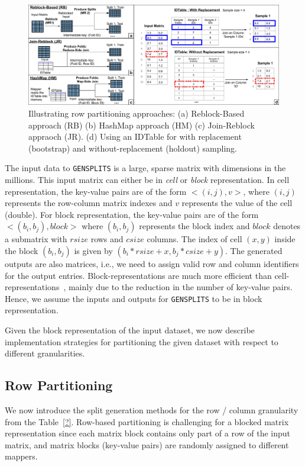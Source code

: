 \documentclass{vldb}
\begin{document}
\begin{figure}
\centering
\includegraphics[width=7in]{meta/rbjrhm.pdf}
\caption{Illustrating row partitioning approaches: (a) Reblock-Based approach (RB)
(b) HashMap approach (HM) (c) Join-Reblock appraoch (JR). (d) Using an IDTable for with replacement (bootstrap)
and without-replacement (holdout) sampling.}
\label{fig:blockdiagrams}
\end{figure}

The input data to {\tt GENSPLITS} is a large, sparse matrix with dimensions
in the millions.
This input matrix can either be in {\em cell} or {\em block} representation.
In cell representation, the key-value pairs are of the form $<(i,j), v>$, where $(i,j)$
represents the row-column matrix indexes and $v$ represents the value of the cell (double).
For block representation, the key-value pairs are of the form
$<(b_i,b_j),block>$ where $(b_i,b_j)$ represents the block index and $block$ denotes a submatrix with $rsize$ rows and $csize$ columns. The index of cell $(x,y)$ inside the block
$(b_i,b_j)$ is given by $(b_i*rsize + x, b_j*csize + y)$.
The generated outputs are also matrices, i.e., we need to assign valid row and column
identifiers for the output entries. Block-representations are much more
efficient than cell-representations~\cite{systemml}, mainly due to the
reduction in the number of key-value pairs.
Hence, we assume the inputs and outputs for {\tt GENSPLITS}
to be in block representation.

Given the block representation of the input dataset, we now describe
implementation strategies for partitioning the given dataset with respect to
different granularities.

\subsection{Row Partitioning}
\label{sec:rowpartitioning}
We now introduce the split generation methods for the row / column granularity from the Table~\ref{?}.
Row-based partitioning is challenging for a blocked matrix representation
since each matrix block contains only part of a row of the input matrix,
and matrix blocks (key-value pairs) are randomly assigned to different mappers.
\end{document}
